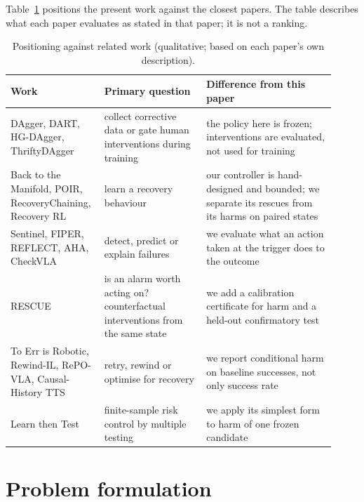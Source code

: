 \documentclass[preprint,12pt]{elsarticle}
\begin{document}
Table~\ref{tab:related} positions the present work against the closest papers. The table describes what each paper evaluates as stated in that paper; it is not a ranking.

\begin{table}[!htbp]
\centering\footnotesize
\caption{Positioning against related work (qualitative; based on each paper's own description).}\label{tab:related}
\begin{tabular}{p{0.24\linewidth}p{0.30\linewidth}p{0.38\linewidth}}
\toprule
Work & Primary question & Difference from this paper\\
\midrule
DAgger, DART, HG-DAgger, ThriftyDAgger \cite{ross2011dagger,laskey2017dart,kelly2019hgdagger,hoque2022thrifty} & collect corrective data or gate human interventions during training & the policy here is frozen; interventions are evaluated, not used for training\\
Back to the Manifold, POIR, RecoveryChaining, Recovery RL \cite{reichlin2022manifold,cideron2023getback,vats2025recoverychaining,thananjeyan2021recoveryrl} & learn a recovery behaviour & our controller is hand-designed and bounded; we separate its rescues from its harms on paired states\\
Sentinel, FIPER, REFLECT, AHA, CheckVLA \cite{agia2025unpacking,romer2025fiper,liu2023reflect,duan2025aha,liu2026checkvla} & detect, predict or explain failures & we evaluate what an action taken at the trigger does to the outcome\\
RESCUE \cite{ahmedt2026rescue} & is an alarm worth acting on? counterfactual interventions from the same state & we add a calibration certificate for harm and a held-out confirmatory test\\
To Err is Robotic, Rewind-IL, RePO-VLA, Causal-History TTS \cite{du2024toerr,zheng2026rewind,liufu2026repovla,li2026causalhistory} & retry, rewind or optimise for recovery & we report conditional harm on baseline successes, not only success rate\\
Learn then Test \cite{angelopoulos2021ltt} & finite-sample risk control by multiple testing & we apply its simplest form to harm of one frozen candidate\\
\bottomrule
\end{tabular}
\end{table}

\section{Problem formulation}\label{sec:problem}
\end{document}
